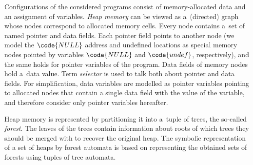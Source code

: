 Configurations of the considered programs consist of
memory-allocated data and an assignment of variables.
\emph{Heap memory} can be viewed as a~(directed) graph whose nodes correspond
to allocated memory cells.
Every node contains a~set of named pointer and data fields.
Each pointer field points to another node (we model the
$\code{NULL}$ address and undefined locations as special memory nodes pointed by variables
$\code{NULL}$ and $\code{undef}$, respectively), and the same holds for pointer variables of the program.
Data fields of memory nodes hold a~data value.
Term \emph{selector} is used to talk both about pointer and data fields.
For simplification, data variables are modelled as pointer variables pointing to
allocated nodes that contain a single data field with the value of the
variable, and therefore consider only pointer
variables hereafter.


Heap memory is represented by partitioning it into a~tuple of trees, the
so-called \emph{forest}.
The leaves of the trees contain information about roots of which trees they should be merged with to recover the original heap. 
The symbolic representation of a set of heaps by forest automata is based
on representing the obtained sets of forests using tuples of tree automata.
%


